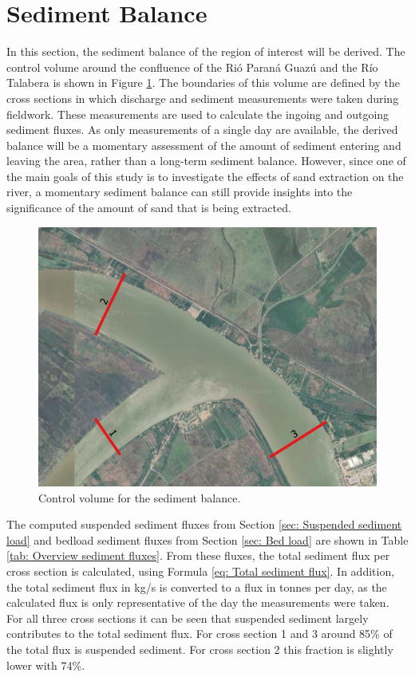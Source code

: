 \newpage
\section{Sediment Balance}
\label{sec: Sediment Balance}
In this section, the sediment balance of the region of interest will be derived. The control volume around the confluence of the Rió Paraná Guazú and the Río Talabera is shown in Figure \ref{fig:Area sediment balance}. The boundaries of this volume are defined by the cross sections in which discharge and sediment measurements were taken during fieldwork. These measurements are used to calculate the ingoing and outgoing sediment fluxes. As only measurements of a single day are available, the derived balance will be a momentary assessment of the amount of sediment entering and leaving the area, rather than a long-term sediment balance. However, since one of the main goals of this study is to investigate the effects of sand extraction on the river, a momentary sediment balance can still provide insights into the significance of the amount of sand that is being extracted.

\begin{figure}[H]
    \centering
    \includegraphics[width=0.75\linewidth]{figures/ch6/Map_sed_balance.png}
    \caption{Control volume for the sediment balance.}
    \label{fig:Area sediment balance}
\end{figure}

The computed suspended sediment fluxes from Section \ref{sec: Suspended sediment load} and bedload sediment fluxes from Section \ref{sec: Bed load} are shown in Table \ref{tab: Overview sediment fluxes}. From these fluxes, the total sediment flux per cross section is calculated, using Formula \ref{eq: Total sediment flux}. In addition, the total sediment flux in kg/s is converted to a flux in tonnes per day, as the calculated flux is only representative of the day the measurements were taken. For all three cross sections it can be seen that suspended sediment largely contributes to the total sediment flux. For cross section 1 and 3 around 85\% of the total flux is suspended sediment. For cross section 2 this fraction is slightly lower with 74\%. 

